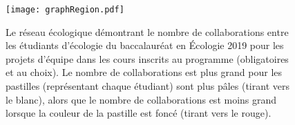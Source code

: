 \documentclass[twoside,twocolumn]{article}
\begin{document}
\begin{figure}[h]
\texttt{[image: graphRegion.pdf]}
\caption{Le réseau écologique démontrant le nombre de collaborations entre les étudiants d'écologie du baccalauréat en Écologie 2019 pour les projets d'équipe dans les cours inscrits au programme (obligatoires et au choix). Le nombre de collaborations est plus grand pour les pastilles (représentant chaque étudiant) sont plus pâles (tirant vers le blanc), alors que le nombre de collaborations est moins grand lorsque la couleur de la pastille est foncé (tirant vers le rouge).}
\end{figure}


\end{document}
